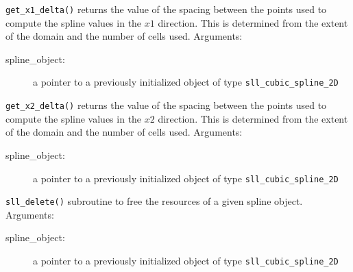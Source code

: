 \documentclass[]{report}   %
\begin{document}
\begin{description}
		\item \verb+get_x1_delta()+ returns the value of the spacing between the points used to compute the spline values in the $x1$ direction. This is determined from the extent of the domain and the number of cells used. Arguments:
		\begin{description}
			\item[spline\_object:] a pointer to a previously initialized object of type \verb+sll_cubic_spline_2D+
		\end{description}
		
		\item \verb+get_x2_delta()+ returns the value of the spacing between the points used to compute the spline values in the $x2$ direction. This is determined from the extent of the domain and the number of cells used. Arguments:
		\begin{description}
			\item[spline\_object:] a pointer to a previously initialized object of type \verb+sll_cubic_spline_2D+
		\end{description}

	\item \verb+sll_delete()+ subroutine to free the resources of a given spline object. Arguments:
		\begin{description}
			\item[spline\_object:] a pointer to a previously initialized object of type \verb+sll_cubic_spline_2D+
		\end{description}
\end{description}
   

   
\end{document}
